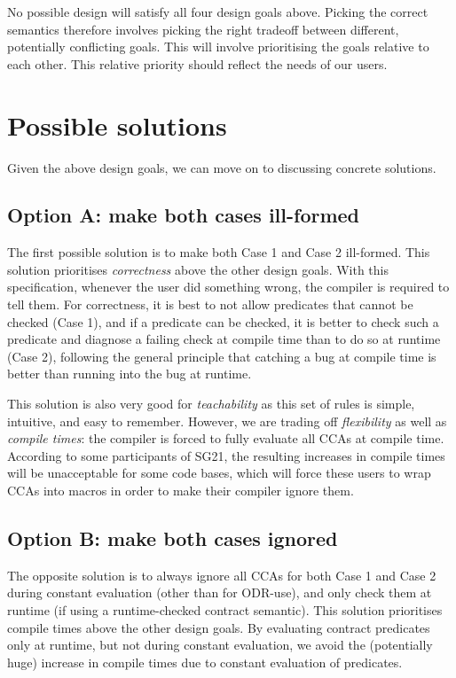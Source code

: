 No possible design will satisfy all four design goals above. Picking the correct semantics therefore involves picking the right tradeoff between different, potentially conflicting goals. This will involve prioritising the goals relative to each other. This relative priority should reflect the needs of our users.

\section{Possible solutions}

Given the above design goals, we can move on to discussing concrete solutions.

\subsection{Option A: make both cases ill-formed}

The first possible solution is to make both Case 1 and Case 2 ill-formed. This solution prioritises \emph{correctness} above the other design goals. With this specification, whenever the user did something wrong, the compiler is required to tell them. For correctness, it is best to not allow predicates that cannot be checked (Case 1), and if a predicate can be checked, it is better to check such a predicate and diagnose a failing check at compile time than to do so at runtime (Case 2), following the general principle that catching a bug at compile time is better than running into the bug at runtime.

This solution is also very good for \emph{teachability} as this set of rules is simple, intuitive, and easy to remember. However, we are trading off \emph{flexibility} as well as \emph{compile times}: the compiler is forced to fully evaluate all CCAs at compile time. According to some participants of SG21, the resulting increases in compile times will be unacceptable for some code bases, which will force these users to wrap CCAs into macros in order to make their compiler ignore them.

\subsection{Option B: make both cases ignored}

The opposite solution is to always ignore all CCAs for both Case 1 and Case 2 during constant evaluation (other than for ODR-use), and only check them at runtime (if using a runtime-checked contract semantic). This solution prioritises compile times above the other design goals. By evaluating contract predicates only at runtime, but not during constant evaluation, we avoid the (potentially huge) increase in compile times due to constant evaluation of predicates.

